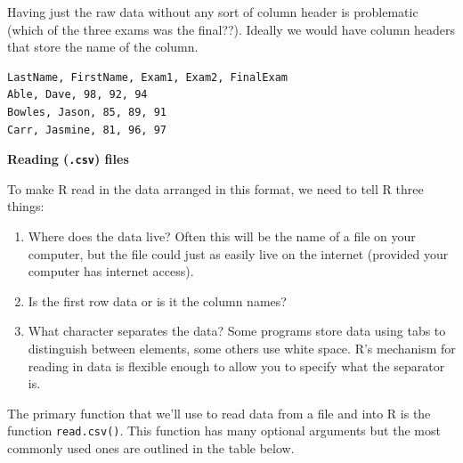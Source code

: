 \documentclass[
  letterpaper,
  DIV=11,
  numbers=noendperiod]{scrreprt}
\begin{document}
Having just the raw data without any sort of column header is
problematic (which of the three exams was the final??). Ideally we would
have column headers that store the name of the column.

\begin{verbatim}
LastName, FirstName, Exam1, Exam2, FinalExam
Able, Dave, 98, 92, 94
Bowles, Jason, 85, 89, 91
Carr, Jasmine, 81, 96, 97
\end{verbatim}

\textbf{Reading (\texttt{.csv}) files}

To make R read in the data arranged in this format, we need to tell R
three things:

\begin{enumerate}
\def\labelenumi{\arabic{enumi}.}
\item
  Where does the data live? Often this will be the name of a file on
  your computer, but the file could just as easily live on the internet
  (provided your computer has internet access).
\item
  Is the first row data or is it the column names?
\item
  What character separates the data? Some programs store data using tabs
  to distinguish between elements, some others use white space. R's
  mechanism for reading in data is flexible enough to allow you to
  specify what the separator is.
\end{enumerate}

The primary function that we'll use to read data from a file and into R
is the function \texttt{read.csv()}. This function has many optional
arguments but the most commonly used ones are outlined in the table
below.
\end{document}
